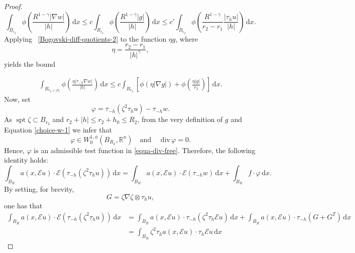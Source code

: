 \documentclass[leqno,11pt]{amsart}%
\numberwithin{equation}{section}
\newcommand{\dive}{\mathrm{div}\,}
\def\R{\mathbb R}
\def\d{\mathrm{d}}
\def\E{\mathcal{E}}
\def\dx{\d x}
\DeclareMathOperator\spt{spt}
\theoremstyle{definition}
\numberwithin{equation}{section}
\begin{document}
\begin{proof}
\begin{equation}\label{choice-w-2}
      \displaystyle\int_{B_{r_2}}\phi\left(\frac{R^{1-\gamma}|\nabla w|}{|h|}\right)\,\dx
        \le c\int_{B_{r_2}}\phi\left(\frac{R^{1-\gamma}|g|}{|h|}\right)\,\dx
      \le c'\int_{B_{r_2}}\phi\left(\frac{R^{1-\gamma}}{r_2-r_1}\frac{|\tau_hu|}{|h|}\right)\,\dx.
  \end{equation}
 Applying ~\eqref{Bogovski-diff-quotients-2} to the
  function $\eta g$, where  
  \begin{equation}
    \eta=\frac{r_2-r_1}{|h|^\gamma},\label{choice-lambda}
  \end{equation}
yields the bound 

  \begin{align}\label{choice-w-3}
      \int_{B_{r_2+|h|}}\phi\left(\frac{\eta|\tau_{-h}\nabla w|}{|h|}\right)\,\dx
        \leq c\int_{B_{r_2}}\left[\phi\left(\eta|\nabla g|\right)+\phi\left(\frac{\eta|g|}{{r_2}}\right)\right]\,\dx.
  \end{align}
Now, set 
\begin{equation}\label{def-phi}
    \varphi=\tau_{-h}(\zeta^2\tau_hu)-\tau_{-h}w.
  \end{equation}
As $\spt\zeta\subset B_{r_2}$ and $r_2+|h|\le
  r_2+h_0\le R_2$, from the very definition of $g$ and Equation \eqref{choice-w-1} we infer that
  \begin{equation}\label{def-phi'}
    \varphi \in W^{1,\phi}_0(B_{R_2},\R^n) \quad \text{and } \quad \dive\varphi=0.
  \end{equation}
Hence,  $\varphi$ is an admissible 
  test function in \eqref{equa-div-free}. Therefore, the following identity holds:
  \begin{equation}\label{test-1}
    \int_{B_R} a(x,\E u) \cdot \E(\tau_{-h}(\zeta^2\tau_hu))\,\dx
    =
    \int_{B_R}  a(x,\E u)\cdot\E
    (\tau_{-h}w)\,\dx
    +
    \int_{B_R}f\cdot\varphi\,\dx.
  \end{equation}
 By setting, for brevity,
  \begin{equation}\label{def-G}
    G=\zeta\nabla\zeta\otimes \tau_hu,
  \end{equation}
  one has that
  \begin{align}\label{test-lhs}
    \int_{B_R}  a(x,\E u)\cdot \E(\tau_{-h}(\zeta^2\tau_hu)) \,\dx & =
      \int_{B_R}  a(x,\E u)\cdot\tau_{-h}(\zeta^2\tau_h\E u)\,\dx
      +
      \int_{B_R}  a(x,\E u)\cdot\tau_{-h}(G+G^T) \,\dx\\\nonumber
    & =
      \int_{B_R}\zeta^2  \tau_ha(x,\E u)\cdot \tau_h\E u \,\dx

\end{align}
\end{proof}
\end{document}
